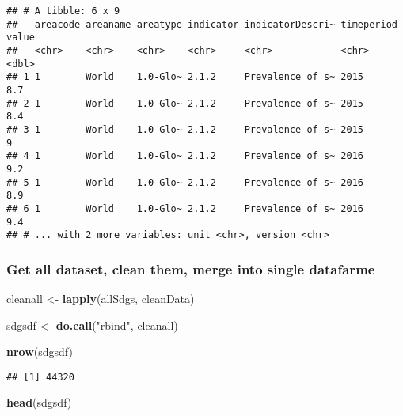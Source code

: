 \documentclass[]{article}
\newenvironment{Shaded}{\begin{snugshade}}{\end{snugshade}}
\newcommand{\KeywordTok}[1]{\textcolor[rgb]{0.13,0.29,0.53}{\textbf{#1}}}
\newcommand{\DataTypeTok}[1]{\textcolor[rgb]{0.13,0.29,0.53}{#1}}
\newcommand{\StringTok}[1]{\textcolor[rgb]{0.31,0.60,0.02}{#1}}
\newcommand{\OperatorTok}[1]{\textcolor[rgb]{0.81,0.36,0.00}{\textbf{#1}}}
\newcommand{\NormalTok}[1]{#1}
\begin{document}
\begin{Shaded}
\end{Shaded}

\begin{verbatim}
## # A tibble: 6 x 9
##   areacode areaname areatype indicator indicatorDescri~ timeperiod value
##   <chr>    <chr>    <chr>    <chr>     <chr>            <chr>      <dbl>
## 1 1        World    1.0-Glo~ 2.1.2     Prevalence of s~ 2015         8.7
## 2 1        World    1.0-Glo~ 2.1.2     Prevalence of s~ 2015         8.4
## 3 1        World    1.0-Glo~ 2.1.2     Prevalence of s~ 2015         9  
## 4 1        World    1.0-Glo~ 2.1.2     Prevalence of s~ 2016         9.2
## 5 1        World    1.0-Glo~ 2.1.2     Prevalence of s~ 2016         8.9
## 6 1        World    1.0-Glo~ 2.1.2     Prevalence of s~ 2016         9.4
## # ... with 2 more variables: unit <chr>, version <chr>
\end{verbatim}

\subsubsection{Get all dataset, clean them, merge into single
datafarme}\label{get-all-dataset-clean-them-merge-into-single-datafarme}

\begin{Shaded}
\begin{Highlighting}[]
\NormalTok{cleanall <-}\StringTok{ }\KeywordTok{lapply}\NormalTok{(allSdgs, cleanData)}

\NormalTok{sdgsdf <-}\StringTok{ }\KeywordTok{do.call}\NormalTok{(}\StringTok{"rbind"}\NormalTok{, cleanall)}

\KeywordTok{nrow}\NormalTok{(sdgsdf)}
\end{Highlighting}
\end{Shaded}

\begin{verbatim}
## [1] 44320
\end{verbatim}

\begin{Shaded}
\begin{Highlighting}[]
\KeywordTok{head}\NormalTok{(sdgsdf)}
\end{Highlighting}
\end{Shaded}
\end{document}
